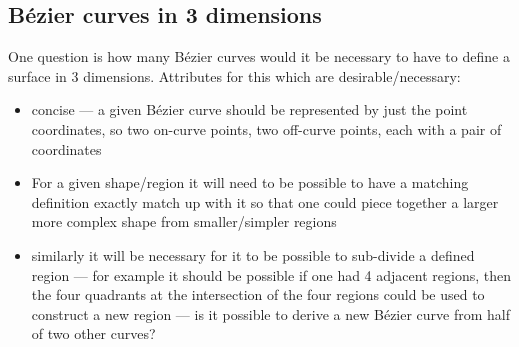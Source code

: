 \documentclass{ltxdoc}
\begin{document}
%
%
%
%
%
%
%
%

\subsection{Bézier curves in 3 dimensions}
 
One question is how many Bézier curves would it be necessary to have to define a surface
in 3 dimensions. Attributes for this which are desirable/necessary:

\begin{itemize}
\item concise --- a given Bézier curve should be represented by just the point coordinates, 
      so two on-curve points, two off-curve points, each with a pair of coordinates
\item For a given shape/region it will need to be possible to have a matching definition 
      exactly match up with it so that one could piece together a larger more complex shape 
      from smaller/simpler regions
\item similarly it will be necessary for it to be possible to sub-divide a defined region --- 
      for example it should be possible if one had 4 adjacent regions, then the four quadrants 
      at the intersection of the four regions could be used to construct a new region --- is it
      possible to derive a new Bézier curve from half of two other curves?
\end{itemize}
\end{document}
